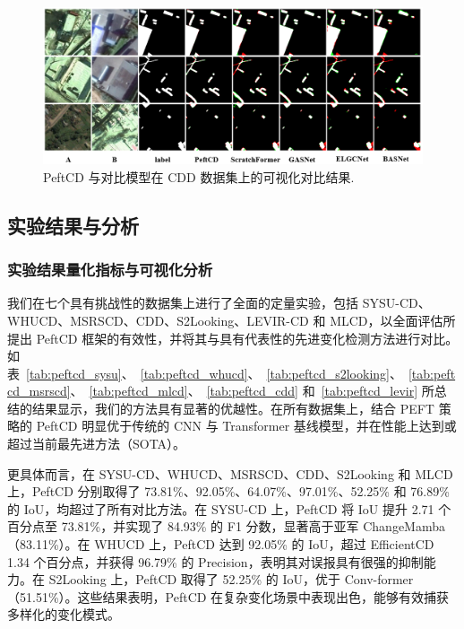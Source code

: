 \begin{figure}[!htb]
  \centering
  \includegraphics[width=\textwidth]{paper_figures/基于AI基础模型微调的变化检测模型研究/PeftCD/peftcd_cdd.png}
  \caption{PeftCD 与对比模型在 CDD 数据集上的可视化对比结果.}
  \label{fig:peftcd_cdd}
\end{figure}

\subsection{实验结果与分析}
\subsubsection{实验结果量化指标与可视化分析}

我们在七个具有挑战性的数据集上进行了全面的定量实验，包括 SYSU-CD、WHUCD、MSRSCD、CDD、S2Looking、LEVIR-CD 和 MLCD，以全面评估所提出 PeftCD 框架的有效性，并将其与具有代表性的先进变化检测方法进行对比。如表~\ref{tab:peftcd_sysu}、~\ref{tab:peftcd_whucd}、~\ref{tab:peftcd_s2looking}、~\ref{tab:peftcd_msrscd}、~\ref{tab:peftcd_mlcd}、~\ref{tab:peftcd_cdd} 和~\ref{tab:peftcd_levir} 所总结的结果显示，我们的方法具有显著的优越性。在所有数据集上，结合 PEFT 策略的 PeftCD 明显优于传统的 CNN 与 Transformer 基线模型，并在性能上达到或超过当前最先进方法（SOTA）。  

更具体而言，在 SYSU-CD、WHUCD、MSRSCD、CDD、S2Looking 和 MLCD 上，PeftCD 分别取得了 73.81\%、92.05\%、64.07\%、97.01\%、52.25\% 和 76.89\% 的 IoU，均超过了所有对比方法。在 SYSU-CD 上，PeftCD 将 IoU 提升 2.71 个百分点至 73.81\%，并实现了 84.93\% 的 F1 分数，显著高于亚军 ChangeMamba（83.11\%）。在 WHUCD 上，PeftCD 达到 92.05\% 的 IoU，超过 EfficientCD 1.34 个百分点，并获得 96.79\% 的 Precision，表明其对误报具有很强的抑制能力。在 S2Looking 上，PeftCD 取得了 52.25\% 的 IoU，优于 Conv-former（51.51\%）。这些结果表明，PeftCD 在复杂变化场景中表现出色，能够有效捕获多样化的变化模式。  



